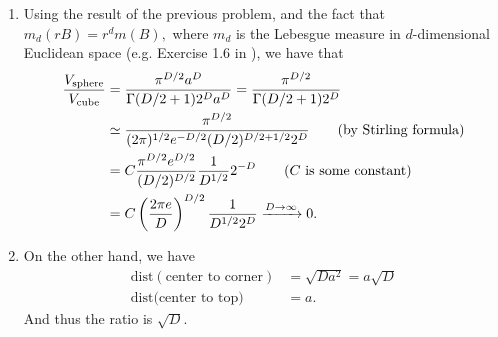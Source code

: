 \begin{enumerate}[leftmargin={*}]
\item Using the result of the previous problem, and the fact that $m_{d}(rB)=r^{d}m(B),$
where $m_{d}$ is the Lebesgue measure in $d$-dimensional Euclidean
space (e.g. Exercise 1.6 in \cite{stein2005real}), we have that 
\begin{align*}
\frac{V_{\text{sphere}}}{V_{\text{cube}}} & =\frac{\pi^{D/2}a^{D}}{\Gamma(D/2+1)2^{D}a^{D}}=\frac{\pi^{D/2}}{\Gamma(D/2+1)2^{D}}\\
 & \simeq\frac{\pi^{D/2}}{(2\pi)^{1/2}e^{-D/2}(D/2)^{D/2+1/2}2^{D}}\tag{by Stirling formula}\\
 & =C\frac{\pi^{D/2}e^{D/2}}{(D/2)^{D/2}}\frac{1}{D^{1/2}}2^{-D}\tag{\ensuremath{C} is some constant}\\
 & =C\left(\frac{2\pi e}{D}\right)^{D/2}\frac{1}{D^{1/2}2^{D}}\xrightarrow{D\rightarrow\infty}0.
\end{align*}
\item On the other hand, we have 
\begin{align*}
\text{dist}(\text{center to corner}) & =\sqrt{Da^{2}}=a\sqrt{D}\\
\text{dist}(\text{center to top)} & =a.
\end{align*}
And thus the ratio is $\sqrt{D}$. 
\end{enumerate}
